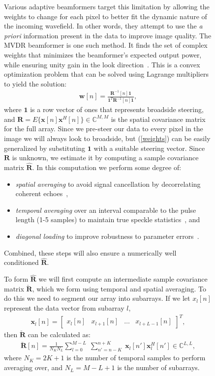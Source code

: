 \documentclass[12pt,journal,draftclsnofoot,onecolumn]{IEEEtran}
\newcommand\bmat[1]{\begin{bmatrix}#1\end{bmatrix}}
\newcommand\sumb[2]{\sum\limits_{#1}^{#2}\;}
\newcommand\T{^{\scriptscriptstyle T}}
\renewcommand\H{^{\scriptscriptstyle H}}
\renewcommand\vec[1]{\boldsymbol{#1}}
\newcommand\mat[1]{\boldsymbol{#1}}
\newcommand\1{\vec 1}
\newcommand*\x{\vec x}
\newcommand*\R{\mat R}
\newcommand*\Ri{\R^{-1}}
\newcommand*\eR{\mat{\hat R}}
\begin{document}
\begin{figure}[H]
Various adaptive beamformers target this limitation by allowing the weights to change for each pixel to better fit the dynamic nature of the incoming wavefield. In other words, they attempt to use the \emph{a priori} information present in the data to improve image quality. The MVDR beamformer is one such method. It finds the set of complex weights that minimizes the beamformer's expected output power, while ensuring unity gain in the look direction~\cite{Capon1969}. This is a convex optimization problem that can be solved using Lagrange multipliers to yield the solution:
\begin{gather}
\vec w[n] = \frac{\Ri[n]\1}{\1\T\Ri[n]\1},\label{weights}
\end{gather}
where $\1$ is a row vector of ones that represents broadside steering, and $\R=E\{\x[n]\x\H[n]\} \in\mathbb{C}^{M,M}$ is the spatial covariance matrix for the full array. Since we pre-steer our data to every pixel in the image we will always look to broadside, but (\ref{weights}) can be easily generalized by substituting $\1$ with a suitable steering vector. Since $\R$ is unknown, we estimate it by computing a sample covariance matrix $\eR$. In this computation we perform some degree of:
\begin{itemize}
\item \emph{spatial averaging} to avoid signal cancellation by decorrelating coherent echoes~\cite{Kailath1985},
\item \emph{temporal averaging} over an interval comparable to the pulse length (1-5 samples) to maintain true speckle statistics~\cite{Synnevag2009a}, and
\item \emph{diagonal loading} to improve robustness to parameter errors~\cite{Cox1987,Maksym1979}.
\end{itemize}%
%
%
Combined, these steps will also ensure a numerically well conditioned $\eR$.

To form $\eR$ we will first compute an intermediate sample covariance matrix $\breve{\R}$, which we form using temporal and spatial averaging. To do this we need to segment our array into subarrays. If we let $x_l[n]$ represent the data vector from subarray $l$,
\begin{gather}
\x_l[n] = \bmat{x_l[n] & x_{l+1}[n] & \dots & x_{l+L-1}[n]}\T,
\end{gather}
then $\breve{\R}$ can be calculated as:
\begin{gather}
\breve{\R}[n] =  \frac{1}{N_K N_L} \sumb{l=0}{M-L}\sumb{n'=n-K}{n+K} \x_l[n']\x_l\H[n'] \in\mathbb{C}^{L,L},\label{spatialR}
\end{gather}
where $N_K = 2K+1$ is the number of temporal samples to perform averaging over, and $N_L = M-L+1$ is the number of subarrays.


\end{figure}
\end{document}

